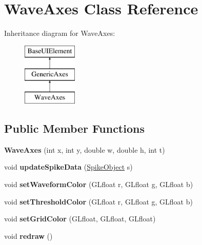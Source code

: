 \hypertarget{classWaveAxes}{\section{Wave\-Axes Class Reference}
\label{classWaveAxes}
}
Inheritance diagram for Wave\-Axes\-:\begin{figure}[H]
\begin{center}
\leavevmode
\includegraphics[height=3.000000cm]{classWaveAxes}
\end{center}
\end{figure}
\subsection*{Public Member Functions}
\begin{DoxyCompactItemize}
\item 
\hypertarget{classWaveAxes_a3e1b38a080b666c68e6b9f038ac5ed3d}{{\bfseries Wave\-Axes} (int x, int y, double w, double h, int t)}\label{classWaveAxes_a3e1b38a080b666c68e6b9f038ac5ed3d}

\item 
\hypertarget{classWaveAxes_a4850fe1b808de00c9a8b44e859cea21e}{void {\bfseries update\-Spike\-Data} (\hyperlink{structSpikeObject}{Spike\-Object} s)}\label{classWaveAxes_a4850fe1b808de00c9a8b44e859cea21e}

\item 
\hypertarget{classWaveAxes_a31f253cb5b82309e8824ec9892eda266}{void {\bfseries set\-Waveform\-Color} (G\-Lfloat r, G\-Lfloat g, G\-Lfloat b)}\label{classWaveAxes_a31f253cb5b82309e8824ec9892eda266}

\item 
\hypertarget{classWaveAxes_ac7eb4c088dfe493ff3304681321c1d9e}{void {\bfseries set\-Threshold\-Color} (G\-Lfloat r, G\-Lfloat g, G\-Lfloat b)}\label{classWaveAxes_ac7eb4c088dfe493ff3304681321c1d9e}

\item 
\hypertarget{classWaveAxes_a2434fce7713b5d48d8f8b1175fd1d4d4}{void {\bfseries set\-Grid\-Color} (G\-Lfloat, G\-Lfloat, G\-Lfloat)}\label{classWaveAxes_a2434fce7713b5d48d8f8b1175fd1d4d4}

\item 
\hypertarget{classWaveAxes_a45afcfea4c34075e6d73786642846bd5}{void {\bfseries redraw} ()}\label{classWaveAxes_a45afcfea4c34075e6d73786642846bd5}

\end{DoxyCompactItemize}

